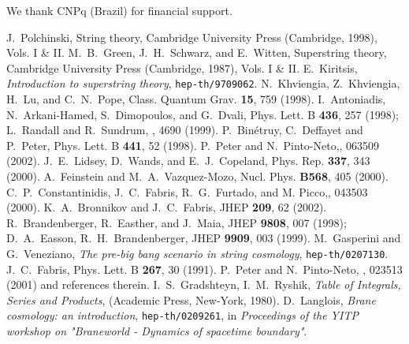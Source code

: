 \documentclass[a4paper,aps,twocolumn,prd,showpacs,nofootinbib]{revtex4}
\begin{document}
\acknowledgments We thank CNPq (Brazil) for financial support.

\begin{thebibliography}{90}
 J.~Polchinski, String theory, Cambridge
University Press (Cambridge, 1998), Vols. I \& II.
 M.~B.~Green, J.~H.~Schwarz, and E.~Witten, Superstring
theory, Cambridge University Press (Cambridge, 1987), Vols. I \& II.
 E.~Kiritsis, {\it Introduction to superstring
theory}, {\tt hep-th/9709062}.
 N.~Khviengia, Z.~Khviengia, H.~Lu, and C.~N.~Pope,
Class. Quantum Grav.  {\bf 15}, 759 (1998).
 I.~Antoniadis, N.~Arkani-Hamed, S.~Dimopoulos, and
G.~Dvali, Phys. Lett. B {\bf 436}, 257 (1998); L.~Randall and
R.~Sundrum, , 4690 (1999).
 P.~Bin\'etruy, C.~Deffayet and P.~Peter, Phys. Lett.  B
{\bf 441}, 52 (1998).
 P.~Peter and N.~Pinto-Neto,, 063509
(2002).
 J.~E.~Lidsey, D.~Wands, and E.~J.~Copeland,
Phys. Rep.  {\bf 337}, 343 (2000).
 A.~Feinstein and M.~A.~Vazquez-Mozo, Nucl. Phys.
{\bf B568}, 405 (2000).
 C.~P.~Constantinidis, J.~C.~Fabris, R.~G.~Furtado, and
M. Picco,, 043503 (2000).
 K.~A.~Bronnikov and J.~C.~Fabris, JHEP {\bf 209}, 62
(2002).
 R.~Brandenberger, R.~Easther, and J.~Maia, JHEP {\bf
9808}, 007 (1998); D.~A.~Easson, R.~H.~Brandenberger, JHEP {\bf 9909},
003 (1999).
 M.~Gasperini and G.~Veneziano, {\it The pre-big
bang scenario in string cosmology}, {\tt hep-th/0207130}.
 J.~C.~Fabris, Phys. Lett. B {\bf 267}, 30 (1991).
 P.~Peter and N.~Pinto-Neto, , 023513
(2001) and references therein.
 I.~S.~Gradshteyn, I.~M.~Ryshik, {\sl Table of
Integrals, Series and Products}, (Academic Press, New-York, 1980).
 D.~Langlois, {\it Brane cosmology: an
introduction}, {\tt hep-th/0209261}, in {\sl Proceedings of the YITP
workshop on "Braneworld - Dynamics of spacetime boundary"}.
\end{thebibliography}
\end{document}
